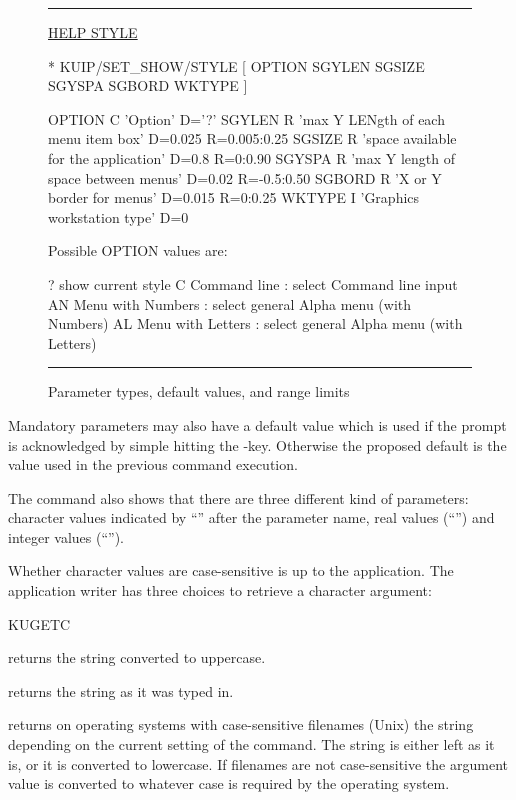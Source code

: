 \begin{figure}[htb]\centering
\hrule
\vspace{.5\baselineskip}
\begin{XMP}
\PROMPT{} \underline{HELP STYLE}

 * KUIP/SET_SHOW/STYLE [ OPTION SGYLEN SGSIZE SGYSPA SGBORD WKTYPE ]

   OPTION     C 'Option' D='?'
   SGYLEN     R 'max Y LENgth of each menu item box' D=0.025 R=0.005:0.25
   SGSIZE     R 'space available for the application' D=0.8 R=0:0.90
   SGYSPA     R 'max Y length of space between menus' D=0.02 R=-0.5:0.50
   SGBORD     R 'X or Y border for menus' D=0.015 R=0:0.25
   WKTYPE     I 'Graphics workstation type' D=0

   Possible OPTION values are:

    ?   show current style
    C   Command line : select Command line input
    AN  Menu with Numbers : select general Alpha menu (with Numbers)
    AL  Menu with Letters : select general Alpha menu (with Letters)
\vspace{-1cm}
\end{XMP}
\caption{Parameter types, default values, and range limits
\label{fig-help-style}}
\hrule
\end{figure}

Mandatory parameters may also have a default value which is used if
the prompt is acknowledged by simple hitting the -key.
Otherwise the proposed default is the value used in the previous
command execution.

The  command also shows that there are three different
kind of parameters:
character values indicated by ``'' after the parameter
name, real values (``'') and integer values
(``'').

Whether character values are case-sensitive is up to the
application. 
The application writer has three choices to retrieve a character
argument:
\begin{DLtt}{KUGETC}
\item[KUGETC]
returns the string converted to uppercase.
\item[KUGETS]
returns the string as it was typed in.
\item[KUGETF]
returns on operating systems with case-sensitive filenames (Unix) 
the string depending on the current setting of the
 command. 
The string is either left as it is, or it is converted to lowercase.
If filenames are not case-sensitive the argument value is converted to
whatever case is required by the operating system.
\end{DLtt}

